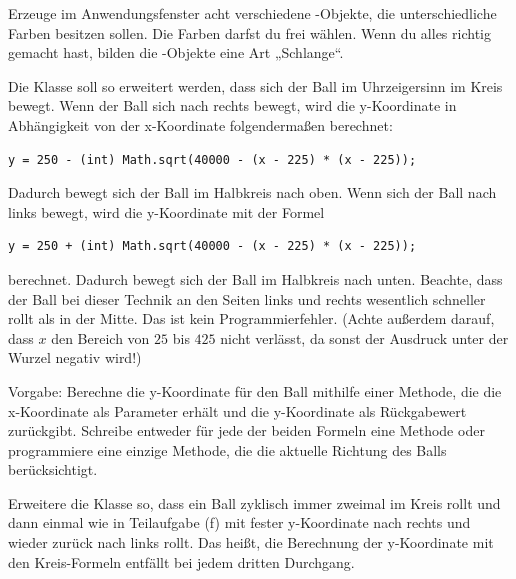 \begin{compactenum}[a)]
Erzeuge im Anwendungsfenster acht verschiedene -Objekte, die
unterschiedliche Farben besitzen sollen. Die Farben darfst du frei wählen.
Wenn du alles richtig gemacht hast, bilden die -Objekte eine Art
„Schlange“.

\item Die Klasse  soll so erweitert werden, dass sich der Ball im
Uhrzeigersinn im Kreis bewegt. Wenn der Ball sich nach rechts bewegt, wird die
y-Koordinate in Abhängigkeit von der x-Koordinate folgendermaßen berechnet:

\begin{lstlisting}
y = 250 - (int) Math.sqrt(40000 - (x - 225) * (x - 225));
\end{lstlisting}

Dadurch bewegt sich der Ball im Halbkreis nach oben. Wenn sich der Ball nach
links bewegt, wird die y-Koordinate mit der Formel

\begin{lstlisting}
y = 250 + (int) Math.sqrt(40000 - (x - 225) * (x - 225));
\end{lstlisting}

berechnet. Dadurch bewegt sich der Ball im Halbkreis nach unten. Beachte, dass
der Ball bei dieser Technik an den Seiten links und rechts wesentlich schneller
rollt als in der Mitte. Das ist kein Programmierfehler. (Achte außerdem darauf,
dass $x$ den Bereich von $25$ bis $425$ nicht verlässt, da sonst der Ausdruck
unter der Wurzel negativ wird!)

Vorgabe: Berechne die y-Koordinate für den Ball mithilfe einer Methode, die
die x-Koordinate als Parameter erhält und die y-Koordinate als Rückgabewert
zurückgibt. Schreibe entweder für jede der beiden Formeln eine Methode oder
programmiere eine einzige Methode, die die aktuelle Richtung des Balls
berücksichtigt.

\item Erweitere die Klasse  so, dass ein Ball zyklisch immer
zweimal im Kreis rollt und dann einmal wie in Teilaufgabe (f) mit fester
y-Koordinate nach rechts und wieder zurück nach links rollt. Das heißt, die
Berechnung der y-Koordinate mit den Kreis-Formeln entfällt bei jedem dritten
Durchgang.

\end{compactenum}
